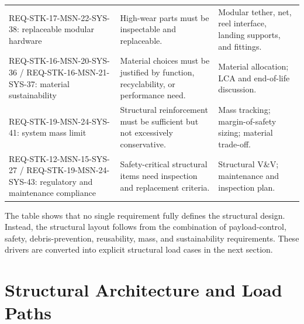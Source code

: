 \begin{table}[H]
\begin{tabularx}{\textwidth}{@{}p{}p{}X@{}}
REQ-STK-17-MSN-22-SYS-38:
replaceable modular hardware
&
High-wear parts must be inspectable and replaceable.
&
Modular tether, net, reel interface, landing supports, and fittings. \\

REQ-STK-16-MSN-20-SYS-36 /
REQ-STK-16-MSN-21-SYS-37:
material sustainability
&
Material choices must be justified by function, recyclability, or performance need.
&
Material allocation; LCA and end-of-life discussion. \\

REQ-STK-19-MSN-24-SYS-41:
system mass limit
&
Structural reinforcement must be sufficient but not excessively conservative.
&
Mass tracking; margin-of-safety sizing; material trade-off. \\

REQ-STK-12-MSN-15-SYS-27 /
REQ-STK-19-MSN-24-SYS-43:
regulatory and maintenance compliance
&
Safety-critical structural items need inspection and replacement criteria.
&
Structural V\&V; maintenance and inspection plan. \\

\bottomrule
\end{tabularx}
\end{table}

The table shows that no single requirement fully defines the structural design. Instead, the structural layout follows from the combination of payload-control, safety, debris-prevention, reusability, mass, and sustainability requirements. These drivers are converted into explicit structural load cases in the next section.

\section{Structural Architecture and Load Paths}





